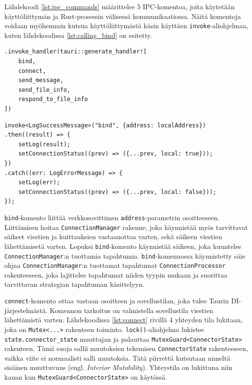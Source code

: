 \documentclass[a4paper,12pt]{article}
\begin{document}
    Lähdekoodi \ref{lst:ipc_commands} määrittelee 5 IPC-komentoa, joita käytetään käyttöliittymän ja Rust-prosessin välisessä kommunikaatiossa. Näitä komentoja voidaan myöhemmin kutsua käyttöliittymästä käsin käyttäen \lstinline{invoke}-aliohjelmaa, kuten lähdekoodissa \ref{lst:calling_bind} on esitetty. \par

    \begin{lstlisting}[caption={IPC-komentojen määritys.}, label={lst:ipc_commands}]
.invoke_handler(tauri::generate_handler![
    bind,
    connect,
    send_message,
    send_file_info,
    respond_to_file_info
])\end{lstlisting}

    \begin{lstlisting}[caption={bind-komennon kutsuminen.}, label={lst:calling_bind}]
invoke<LogSuccessMessage>("bind", {address: localAddress})
.then((result) => {
    setLog(result);
    setConnectionStatus((prev) => ({...prev, local: true}));
})
.catch((err: LogErrorMessage) => {
    setLog(err);
    setConnectionStatus((prev) => ({...prev, local: false}));
});\end{lstlisting}

    \lstinline{bind}-komento liittää verkkosovittimen \lstinline{address}-parametrin osoitteeseen. Liittämisen hoitaa \lstinline{ConnectionManager} rakenne, joka käynnistää myös tarvittavat säikeet viestien ja kuittauksien vastaanottoa varten, sekä säikeen viestien lähettämisetä varten. Lopuksi \lstinline{bind}-komento käynnistää säikeen, joka kuuntelee\\ \lstinline{ConnectionManager}:n tuottamia tapahtumia.
    \lstinline{bind}-komennossa käynnistetty säie ohjaa \lstinline{ConnectionManager}:n tuottamat tapahtumat \lstinline{ConnectionProcessor} rakenteeseen, joka lajittelee tapahtumat niiden tyypin mukaan ja suorittaa tarvittavan strategian tapahtuman käsittelyyn.\par

    \lstinline{connect}-komento ottaa vastaan osoitteen ja sovellustilan, joka tulee Taurin DI-järjestelmästä. Komennon tarkoitus on valmistella sovellustila viestien lähettämistä varten. Lähdekoodissa \ref{lst:connect} rivillä 4 yhteyden tila lukitaan, joka on \lstinline{Mutex<...>} rakenteen toiminto. \lstinline{lock()}-aliohjelma lukistee \\ \lstinline{state.connector_state} muuttujan ja palauttaa \lstinline{MutexGuard<ConnectorState>} rakenteen. Tämä suoja sallii muutoksien tekemisen \lstinline{ConnectorState} rakenteeseen, vaikka viite ei normaalisti salli muutoksia. Tätä piirrettä kutsutaan nimeltä sisäinen muuttuvuus (engl.  \textit{Interior Mutability}). Yhteystila on lukittuna niin kauan kun \lstinline{MutexGuard<ConnectorState>} on käytössä.\par
\end{document}
